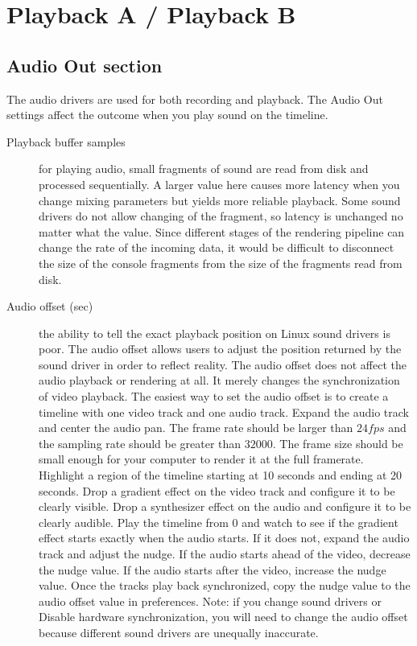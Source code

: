 \section{Playback A / Playback B}%
\label{sec:playback_a_b}

\subsection{Audio Out section}%
\label{sub:audio_out_section}

The audio drivers are used for both recording and playback. The Audio Out settings affect the outcome when you play sound on the timeline.

\begin{description}
    \item[Playback buffer samples] for playing audio, small fragments of sound are read from disk and processed sequentially. A larger value here causes more latency when you change mixing parameters but yields more reliable playback.  Some sound drivers do not allow changing of the fragment, so latency is unchanged no matter what the value. Since different stages of the rendering pipeline can change the rate of the incoming data, it would be difficult to disconnect the size of the console fragments from the size of the fragments read from disk.
    \item[Audio offset (sec)] the ability to tell the exact playback position on Linux sound drivers is poor.  The audio offset allows users to adjust the position returned by the sound driver in order to reflect reality. The audio offset does not affect the audio playback or rendering at all. It merely changes the synchronization of video playback. The easiest way to set the audio offset is to create a timeline with one video track and one audio track. Expand the audio track and center the audio pan. The frame rate should be larger than $24 fps$ and the sampling rate should be greater than $32000$. The frame size should be small enough for your computer to render it at the full framerate. Highlight a region of the timeline starting at 10 seconds and ending at 20 seconds. Drop a gradient effect on the video track and configure it to be clearly visible. Drop a synthesizer effect on the audio and configure it to be clearly audible. Play the timeline from 0 and watch to see if the gradient effect starts exactly when the audio starts. If it does not, expand the audio track and adjust the nudge. If the audio starts ahead of the video, decrease the nudge value. If the audio starts after the video, increase the nudge value. Once the tracks play back synchronized, copy the nudge value to the audio offset value in preferences. Note: if you change sound drivers or Disable hardware synchronization, you will need to change the audio offset because different sound drivers are unequally inaccurate.

\end{description}
